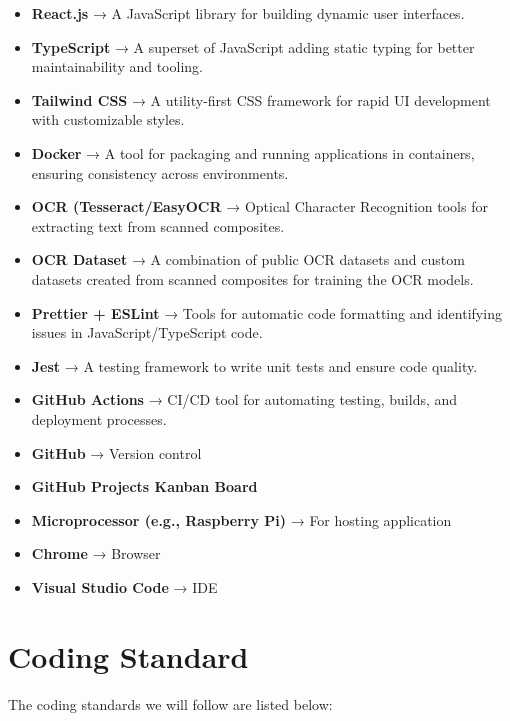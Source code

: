 \documentclass{article}
\begin{document}
\begin{itemize}
    \item \textbf{React.js} → A JavaScript library for building dynamic user interfaces.
    \item \textbf{TypeScript} → A superset of JavaScript adding static typing for better maintainability and tooling.
    \item \textbf{Tailwind CSS} → A utility-first CSS framework for rapid UI development with customizable styles.
    \item \textbf{Docker} → A tool for packaging and running applications in containers, ensuring consistency across environments.
    \item \textbf{OCR (Tesseract/EasyOCR} → Optical Character Recognition tools for extracting text from scanned composites.
    \item \textbf{OCR Dataset} → A combination of public OCR datasets and custom datasets created from scanned composites for training the OCR models.
    \item \textbf{Prettier + ESLint} → Tools for automatic code formatting and identifying issues in JavaScript/TypeScript code.
    \item \textbf{Jest} → A testing framework to write unit tests and ensure code quality.
    \item \textbf{GitHub Actions} → CI/CD tool for automating testing, builds, and deployment processes.
    \item \textbf{GitHub} → Version control
    \item \textbf{GitHub Projects Kanban Board}
    \item \textbf{Microprocessor (e.g., Raspberry Pi)} → For hosting application
    \item \textbf{Chrome} → Browser
    \item \textbf{Visual Studio Code} → IDE
\end{itemize}

\section{Coding Standard}

The coding standards we will follow are listed below:
\end{document}
